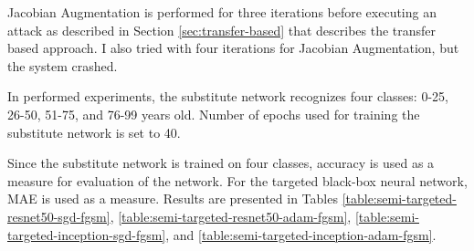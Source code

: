Jacobian Augmentation is performed for three iterations before executing an attack as described in Section \ref{sec:transfer-based} that describes the transfer based approach. I also tried with four iterations for Jacobian Augmentation, but the system crashed. 

In performed experiments, the substitute network recognizes four classes: 0-25, 26-50, 51-75, and 76-99 years old. Number of epochs used for training the substitute network is set to 40.

Since the substitute network is trained on four classes, accuracy is used as a measure for evaluation of the network. For the targeted black-box neural network, MAE is used as a measure. Results are presented in Tables
\ref{table:semi-targeted-resnet50-sgd-fgsm},
\ref{table:semi-targeted-resnet50-adam-fgsm}, 
\ref{table:semi-targeted-inception-sgd-fgsm}, and
\ref{table:semi-targeted-inception-adam-fgsm}.


\begin{table}[]
\caption{Substitute network: ResNet50 architecture with SGD optimizer; Attack: FGSM}
\label{table:semi-targeted-resnet50-sgd-fgsm}
\end{table}


